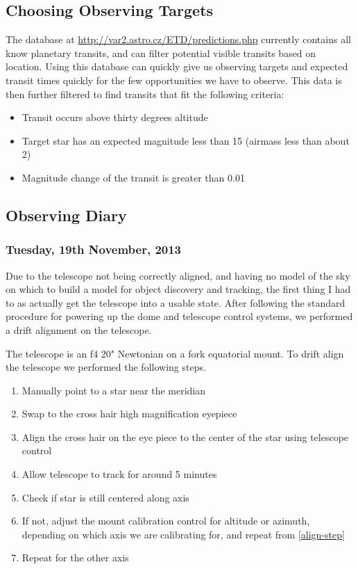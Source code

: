 
\subsection{Choosing Observing Targets}

The database at \url{http://var2.astro.cz/ETD/predictions.php} currently contains all know planetary transits, and can filter potential visible transits based on location. Using this database can quickly give us observing targets and expected transit times quickly for the few opportunities we have to observe. This data is then further filtered to find transits that fit the following criteria:
\begin{itemize}
  \item Transit occurs above thirty degrees altitude
  \item Target star has an expected magnitude less than 15 (airmass less than about 2)
  \item Magnitude change of the transit is greater than 0.01
\end{itemize}

\subsection{Observing Diary}

\subsubsection*{Tuesday, 19th November, 2013}

Due to the telescope not being correctly aligned, and having no model of the sky on which to build a model for object discovery and tracking, the first thing I had to as actually get the telescope into a usable state. After following the standard procedure for powering up the dome and telescope control systems, we performed a drift alignment on the telescope.

The telescope is an f4 20" Newtonian on a fork equatorial mount. To drift align the telescope we performed the following steps.
\begin{enumerate}
    \item Manually point to a star near the meridian
    \item Swap to the cross hair high magnification eyepiece
    \item Align the cross hair on the eye piece to the center of the star using telescope control
    \item \label{align-step}Allow telescope to track for around 5 minutes
    \item Check if star is still centered along axis
    \item If not, adjust the mount calibration control for altitude or azimuth, depending on which axis we are calibrating for, and repeat from \ref{align-step}
    \item Repeat for the other axis
\end{enumerate}

